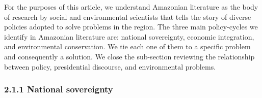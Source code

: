 \documentclass[
]{article}
\begin{document}
For the purposes of this article, we understand Amazonian literature as
the body of research by social and environmental scientists that tells
the story of diverse policies adopted to solve problems in the region.
The three main policy-cycles we identify in Amazonian literature are:
national sovereignty, economic integration, and environmental
conservation. We tie each one of them to a specific problem and
consequently a solution. We close the sub-section reviewing the
relationship between policy, presidential discourse, and environmental
problems.

\hypertarget{national-sovereignty}{%
\subsubsection{2.1.1 National sovereignty}\label{national-sovereignty}}
\end{document}
